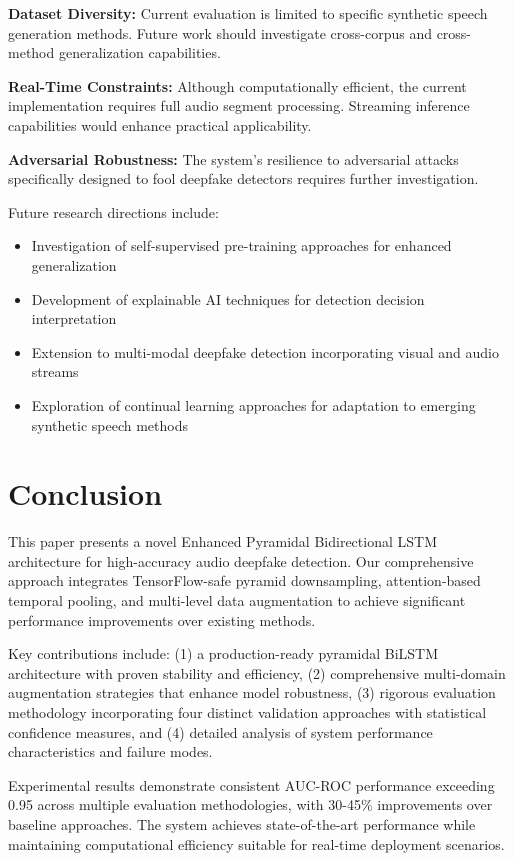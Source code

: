 \documentclass[conference]{IEEEtran}
\begin{document}
\textbf{Dataset Diversity:} Current evaluation is limited to specific synthetic speech generation methods. Future work should investigate cross-corpus and cross-method generalization capabilities.

\textbf{Real-Time Constraints:} Although computationally efficient, the current implementation requires full audio segment processing. Streaming inference capabilities would enhance practical applicability.

\textbf{Adversarial Robustness:} The system's resilience to adversarial attacks specifically designed to fool deepfake detectors requires further investigation.

Future research directions include:
\begin{itemize}
\item Investigation of self-supervised pre-training approaches for enhanced generalization
\item Development of explainable AI techniques for detection decision interpretation
\item Extension to multi-modal deepfake detection incorporating visual and audio streams
\item Exploration of continual learning approaches for adaptation to emerging synthetic speech methods
\end{itemize}

\section{Conclusion}

This paper presents a novel Enhanced Pyramidal Bidirectional LSTM architecture for high-accuracy audio deepfake detection. Our comprehensive approach integrates TensorFlow-safe pyramid downsampling, attention-based temporal pooling, and multi-level data augmentation to achieve significant performance improvements over existing methods.

Key contributions include: (1) a production-ready pyramidal BiLSTM architecture with proven stability and efficiency, (2) comprehensive multi-domain augmentation strategies that enhance model robustness, (3) rigorous evaluation methodology incorporating four distinct validation approaches with statistical confidence measures, and (4) detailed analysis of system performance characteristics and failure modes.

Experimental results demonstrate consistent AUC-ROC performance exceeding 0.95 across multiple evaluation methodologies, with 30-45\% improvements over baseline approaches. The system achieves state-of-the-art performance while maintaining computational efficiency suitable for real-time deployment scenarios.
\end{document}
